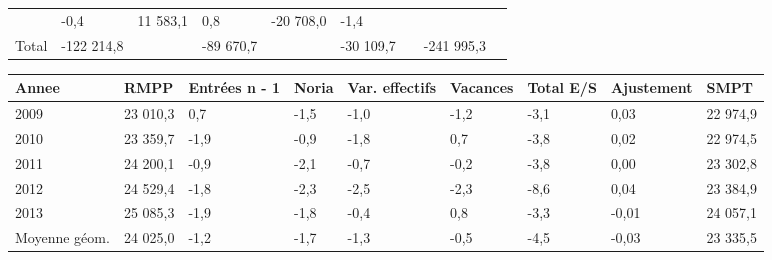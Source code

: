 \begin{longtable}[]{@{}lllllllll@{}}
\begin{minipage}[t]{0.16\columnwidth}
\end{minipage} & \begin{minipage}[t]{0.06\columnwidth}\raggedright
-0,4\strut
\end{minipage} & \begin{minipage}[t]{0.12\columnwidth}\raggedright
11 583,1\strut
\end{minipage} & \begin{minipage}[t]{0.06\columnwidth}\raggedright
0,8\strut
\end{minipage} & \begin{minipage}[t]{0.09\columnwidth}\raggedright
-20 708,0\strut
\end{minipage} & \begin{minipage}[t]{0.06\columnwidth}\raggedright
-1,4\strut
\end{minipage}\tabularnewline
\begin{minipage}[t]{0.05\columnwidth}\raggedright
Total\strut
\end{minipage} & \begin{minipage}[t]{0.10\columnwidth}\raggedright
-122 214,8\strut
\end{minipage} & \begin{minipage}[t]{0.06\columnwidth}\raggedright
\strut
\end{minipage} & \begin{minipage}[t]{0.16\columnwidth}\raggedright
-89 670,7\strut
\end{minipage} & \begin{minipage}[t]{0.06\columnwidth}\raggedright
\strut
\end{minipage} & \begin{minipage}[t]{0.12\columnwidth}\raggedright
-30 109,7\strut
\end{minipage} & \begin{minipage}[t]{0.06\columnwidth}\raggedright
\strut
\end{minipage} & \begin{minipage}[t]{0.09\columnwidth}\raggedright
-241 995,3\strut
\end{minipage} & \begin{minipage}[t]{0.06\columnwidth}\raggedright
\strut
\end{minipage}\tabularnewline
\bottomrule
\end{longtable}

\begin{longtable}[]{@{}lllllllll@{}}
\toprule
Annee & RMPP & Entrées n - 1 & Noria & Var. effectifs & Vacances & Total
E/S & Ajustement & SMPT\tabularnewline
\midrule
\endhead
2009 & 23 010,3 & 0,7 & -1,5 & -1,0 & -1,2 & -3,1 & 0,03 & 22
974,9\tabularnewline
2010 & 23 359,7 & -1,9 & -0,9 & -1,8 & 0,7 & -3,8 & 0,02 & 22
974,5\tabularnewline
2011 & 24 200,1 & -0,9 & -2,1 & -0,7 & -0,2 & -3,8 & 0,00 & 23
302,8\tabularnewline
2012 & 24 529,4 & -1,8 & -2,3 & -2,5 & -2,3 & -8,6 & 0,04 & 23
384,9\tabularnewline
2013 & 25 085,3 & -1,9 & -1,8 & -0,4 & 0,8 & -3,3 & -0,01 & 24
057,1\tabularnewline
Moyenne géom. & 24 025,0 & -1,2 & -1,7 & -1,3 & -0,5 & -4,5 & -0,03 & 23
335,5\tabularnewline
\bottomrule
\end{longtable}

